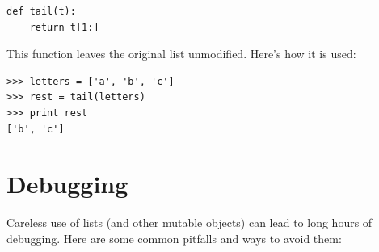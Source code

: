 \documentclass[10pt]{book}
\begin{document}
\begin{verbatim}
def tail(t):
    return t[1:]
\end{verbatim}
%
This function leaves the original list unmodified.
Here's how it is used:

\begin{verbatim}
>>> letters = ['a', 'b', 'c']
>>> rest = tail(letters)
>>> print rest
['b', 'c']
\end{verbatim}



\section{Debugging}

Careless use of lists (and other mutable objects)
can lead to long hours of debugging.  Here are some common
pitfalls and ways to avoid them:
\end{document}
